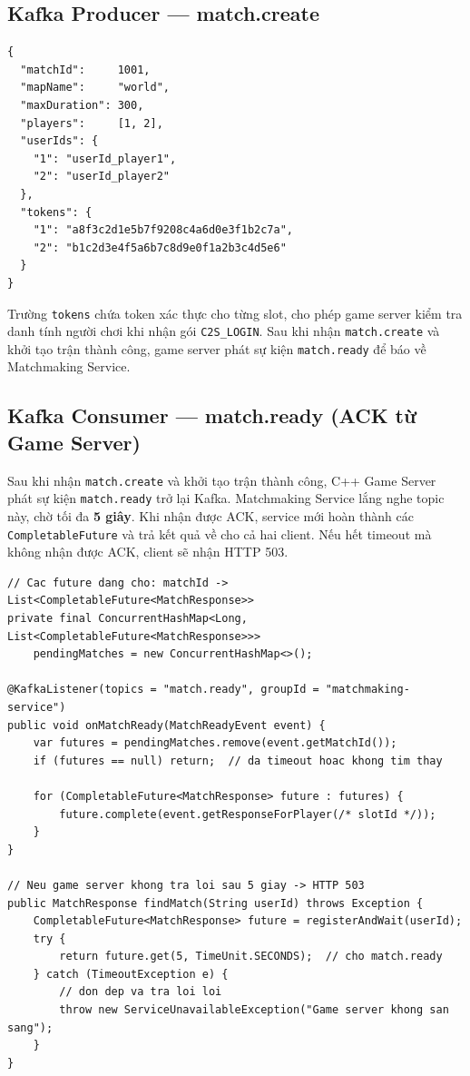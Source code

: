 \documentclass[12pt,a4paper]{report}
\newcommand{\topic}[1]{\texttt{\textcolor{micropurple}{#1}}}
\begin{document}
\subsection{Kafka Producer --- match.create}

\begin{lstlisting}[style=jsonStyle, caption={Payload của sự kiện match.create gửi tới C++ server}, label={lst:matchcreate}]
{
  "matchId":     1001,
  "mapName":     "world",
  "maxDuration": 300,
  "players":     [1, 2],
  "userIds": {
    "1": "userId_player1",
    "2": "userId_player2"
  },
  "tokens": {
    "1": "a8f3c2d1e5b7f9208c4a6d0e3f1b2c7a",
    "2": "b1c2d3e4f5a6b7c8d9e0f1a2b3c4d5e6"
  }
}
\end{lstlisting}

Trường \texttt{tokens} chứa token xác thực cho từng slot, cho phép game server kiểm tra danh tính người chơi khi nhận gói \texttt{C2S\_LOGIN}. Sau khi nhận \topic{match.create} và khởi tạo trận thành công, game server phát sự kiện \topic{match.ready} để báo về Matchmaking Service.

\subsection{Kafka Consumer --- match.ready (ACK từ Game Server)}

Sau khi nhận \topic{match.create} và khởi tạo trận thành công, C++ Game Server phát sự kiện \topic{match.ready} trở lại Kafka. Matchmaking Service lắng nghe topic này, chờ tối đa \textbf{5 giây}. Khi nhận được ACK, service mới hoàn thành các \texttt{CompletableFuture} và trả kết quả về cho cả hai client. Nếu hết timeout mà không nhận được ACK, client sẽ nhận HTTP 503.

\begin{lstlisting}[style=javaStyle, caption={Consumer match.ready --- hoàn thành ghép cặp sau ACK game server}, label={lst:matchready}]
// Cac future dang cho: matchId -> List<CompletableFuture<MatchResponse>>
private final ConcurrentHashMap<Long, List<CompletableFuture<MatchResponse>>>
    pendingMatches = new ConcurrentHashMap<>();

@KafkaListener(topics = "match.ready", groupId = "matchmaking-service")
public void onMatchReady(MatchReadyEvent event) {
    var futures = pendingMatches.remove(event.getMatchId());
    if (futures == null) return;  // da timeout hoac khong tim thay

    for (CompletableFuture<MatchResponse> future : futures) {
        future.complete(event.getResponseForPlayer(/* slotId */));
    }
}

// Neu game server khong tra loi sau 5 giay -> HTTP 503
public MatchResponse findMatch(String userId) throws Exception {
    CompletableFuture<MatchResponse> future = registerAndWait(userId);
    try {
        return future.get(5, TimeUnit.SECONDS);  // cho match.ready
    } catch (TimeoutException e) {
        // don dep va tra loi loi
        throw new ServiceUnavailableException("Game server khong san sang");
    }
}
\end{lstlisting}
\end{document}
